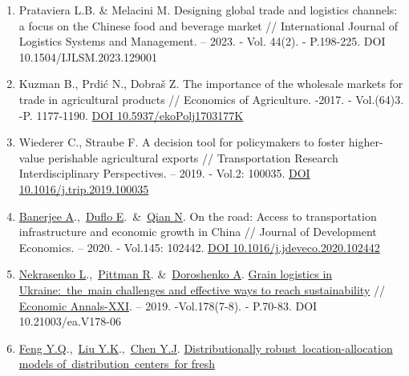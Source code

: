 \begin{enumerate}
{  of agri-food product distribution networks: Modeling and application}
  // New Medit. -- 2020. - Vol.19(4). - P. 51-68. DOI 10.30682/nm2004d
\item
  Prataviera L.B. \& Melacini M. Designing global trade and logistics
  channels: a focus on the Chinese food and beverage market //
  International Journal of Logistics Systems and Management. -- 2023. -
  Vol. 44(2). - P.198-225. DOI 10.1504/IJLSM.2023.129001
\item
  Kuzman B., Prdić N., Dobraš Z. The importance of the wholesale markets
  for trade in agricultural products // Economics of Agriculture. -2017.
  - Vol.(64)3. -P. 1177-1190.
  \href{https://doi.org/10.5937/ekoPolj1703177K}{DOI
  10.5937/ekoPolj1703177K}
\item
  Wiederer C., Straube F. A decision tool for policymakers to foster
  higher-value perishable agricultural exports // Transportation
  Research Interdisciplinary Perspectives. -- 2019. - Vol.2: 100035.
  \href{https://doi.org/10.1016/j.trip.2019.100035}{DOI
  10.1016/j.trip.2019.100035}
\item
  \href{https://www.webofscience.com/wos/author/record/34283995}{Banerjee
  A}.,~\href{https://www.webofscience.com/wos/author/record/7546927}{Duflo
  E}.~\&~\href{https://www.webofscience.com/wos/author/record/27141385}{Qian
  N}. On the road: Access to transportation infrastructure and economic
  growth in China // Journal of Development Economics. -- 2020. -
  Vol.145: 102442.
  \href{https://doi.org/10.1016/j.jdeveco.2020.102442}{DOI
  10.1016/j.jdeveco.2020.102442}
\item
  \href{https://www.webofscience.com/wos/author/record/1406264}{Nekrasenko
  L}.,~\href{https://www.webofscience.com/wos/author/record/30670921}{Pittman
  R}.
  \&~\href{https://www.webofscience.com/wos/author/record/29112586}{Doroshenko
  A}.
  \href{https://www.webofscience.com/wos/woscc/full-record/WOS:000530138400006}{Grain
  logistics in Ukraine:~the~main challenges and effective ways to reach
  sustainability} // \href{javascript:void(0)}{Economic Annals-XXI}. --
  2019. -Vol.178(7-8). - P.70-83. DOI 10.21003/ea.V178-06
\item
  \href{https://www.webofscience.com/wos/author/record/34864370}{Feng
  Y.Q}.,~\href{https://www.webofscience.com/wos/author/record/33997583}{Liu
  Y.K}.,~\href{https://www.webofscience.com/wos/author/record/34807908}{Chen
  Y.J}.
  \href{https://www.webofscience.com/wos/woscc/full-record/WOS:000859686100002}{Distributionally
  robust~location-allocation models of~distribution~centers~for fresh
}
\end{enumerate}
